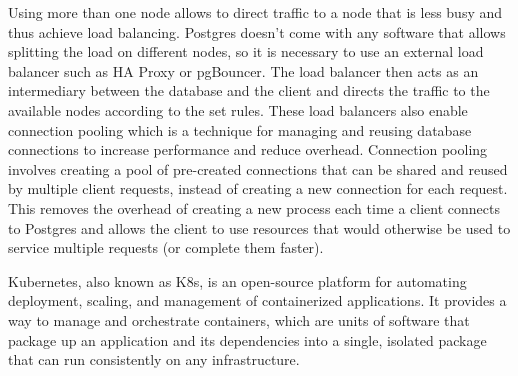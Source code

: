 Using more than one node allows to direct traffic to a node that is less busy and thus achieve load balancing. Postgres doesn't come with any software that allows splitting the load on different nodes, so it is necessary to use an external load balancer such as HA Proxy or pgBouncer. The load balancer then acts as an intermediary between the database and the client and directs the traffic to the available nodes according to the set rules. These load balancers also enable connection pooling which is a technique for managing and reusing database connections to increase performance and reduce overhead. Connection pooling involves creating a pool of pre-created connections that can be shared and reused by multiple client requests, instead of creating a new connection for each request. This removes the overhead of creating a new process each time a client connects to Postgres and allows the client to use resources that would otherwise be used to service multiple requests (or complete them faster). \cite{PerconaBlogConnectionPooling}

Kubernetes, also known as K8s, is an open-source platform for automating deployment, scaling, and management of containerized applications. It provides a way to manage and orchestrate containers, which are units of software that package up an application and its dependencies into a single, isolated package that can run consistently on any infrastructure. \cite{vayghan2019Kubernetes}

